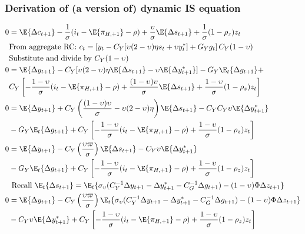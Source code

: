 \subsubsection*{Derivation of (a version of) dynamic IS equation}
\begin{align}\label{eq:dynamic_is_beginning}
    0 &= \E \{ \Delta c_{t+1}\} - \frac{1}{\sigma}(i_t - \E \{ \pi_{H,+1}\} - \rho) + \frac{\upsilon}{\sigma}\E \{ \Delta s_{t+1} \} + \frac{1}{\sigma}(1-\rho_z)z_t \\
    &\text{From aggregate RC: $c_t = \left[ y_t - C_Y[\upsilon(2-\upsilon)\eta s_t + \upsilon y_t^*] + G_Y g_t\right] C_Y(1-\upsilon)$} \nonumber\\
    &\text{Substitute and divide by $C_Y(1-\upsilon)$}\nonumber\\
    0  &= \E \{ \Delta y_{t+1}\}  - C_Y[\upsilon(2-\upsilon)\eta \E \{\Delta s_{t+1} \} - \upsilon \E \{\Delta y_{t+1}^* \}] -G_Y \E_t\{\Delta g_{t+1}\} + \nonumber\\ 
    &C_Y\left[- \frac{1-\upsilon}{\sigma}(i_t - \E \{ \pi_{H,+1}\} - \rho) + \frac{(1-\upsilon)\upsilon}{\sigma}\E \{ \Delta s_{t+1} \} + \frac{1-\upsilon}{\sigma}(1-\rho_z)z_t \right] \\
    0  &= \E \{ \Delta y_{t+1}\}  + C_Y\left(\frac{(1-\upsilon)\upsilon}{\sigma} - \upsilon(2-\upsilon)\eta\right) \E \{\Delta s_{t+1} \} - C_Y C_Y \upsilon \E \{\Delta y_{t+1}^* \} \nonumber\\ 
    &-G_Y \E_t\{\Delta g_{t+1}\} + C_Y\left[- \frac{1-\upsilon}{\sigma}(i_t - \E \{ \pi_{H,+1}\} - \rho)  + \frac{1-\upsilon}{\sigma}(1-\rho_z)z_t \right] \\
    0  &= \E \{ \Delta y_{t+1}\}  - C_Y\left(\frac{\upsilon \varpi}{\sigma}\right) \E \{\Delta s_{t+1} \} - C_Y \upsilon \E \{\Delta y_{t+1}^* \} \nonumber\\
     &-G_Y \E_t\{\Delta g_{t+1}\} + C_Y\left[- \frac{1-\upsilon}{\sigma}(i_t - \E \{ \pi_{H,+1}\} - \rho)  + \frac{1-\upsilon}{\sigma}(1-\rho_z)z_t \right] \\
     &\text{ Recall $\E_t \{ \Delta s_{t+1}\} = \E_t\{\sigma_\upsilon(C_Y^{-1} \Delta y_{t+1} - \Delta y^*_{t+1} - C_G^{-1} \Delta g_{t+1}) - (1-\upsilon)\Phi \Delta z_{t+1}\}$}\nonumber\\
    0 &= \E \{ \Delta y_{t+1}\}  - C_Y\left(\frac{\upsilon \varpi}{\sigma}\right) \E_t\{\sigma_\upsilon(C_Y^{-1} \Delta y_{t+1} - \Delta y^*_{t+1} - C_G^{-1} \Delta g_{t+1}) - (1-\upsilon)\Phi \Delta z_{t+1}\} \nonumber \\ 
    &- C_Y \upsilon \E \{\Delta y_{t+1}^* \} + C_Y\left[- \frac{1-\upsilon}{\sigma}(i_t - \E \{ \pi_{H,+1}\} - \rho)  + \frac{1-\upsilon}{\sigma}(1-\rho_z)z_t \right] \\

\end{align}
